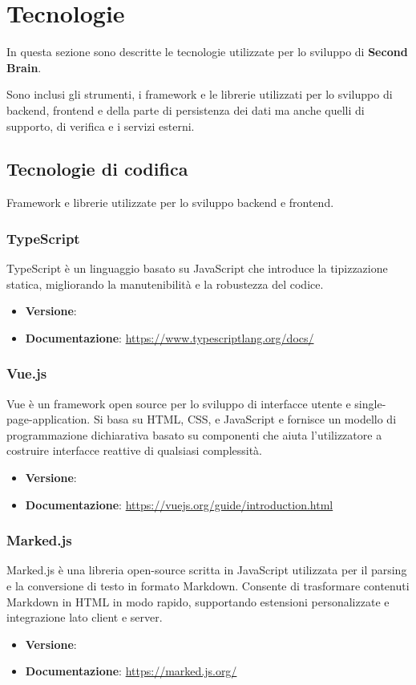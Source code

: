 \documentclass[a4paper,10pt]{article}
\begin{document}
\newpage

\section{Tecnologie}
In questa sezione sono descritte le tecnologie utilizzate per lo sviluppo di \textbf{Second Brain}.

Sono inclusi gli strumenti, i framework e le librerie utilizzati per lo sviluppo di backend, frontend e della parte di persistenza dei dati ma anche quelli di supporto, di verifica e i servizi esterni.
\subsection{Tecnologie di codifica}
Framework e librerie utilizzate per lo sviluppo backend e frontend.

\subsubsection{TypeScript}
TypeScript è un linguaggio basato su JavaScript che introduce la tipizzazione statica, migliorando la manutenibilità e la robustezza del codice.
\begin{itemize}
    \item \textbf{Versione}:
    \item \textbf{Documentazione}: \url{https://www.typescriptlang.org/docs/}
\end{itemize}

\subsubsection{Vue.js}
Vue è un framework open source per lo sviluppo di interfacce utente e single-page-application. Si basa su HTML, CSS, e JavaScript e fornisce un modello di programmazione dichiarativa basato su componenti che aiuta l'utilizzatore a costruire interfacce reattive di qualsiasi complessità.
\begin{itemize}
    \item \textbf{Versione}:
    \item \textbf{Documentazione}: \url{https://vuejs.org/guide/introduction.html}
\end{itemize}

\subsubsection{Marked.js}
Marked.js è una libreria open-source scritta in JavaScript utilizzata per il parsing e la conversione di testo in formato Markdown. Consente di trasformare contenuti Markdown in HTML in modo rapido, supportando estensioni personalizzate e integrazione lato client e server.
\begin{itemize}
    \item \textbf{Versione}:
    \item \textbf{Documentazione}: \url{https://marked.js.org/}
\end{itemize}
\end{document}
